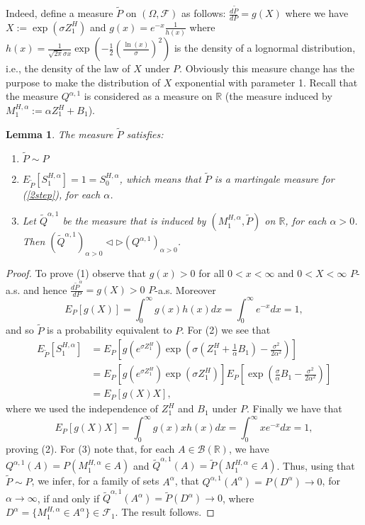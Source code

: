 \documentclass[reqno,a4paper]{amsart}
\theoremstyle{plain}
\theoremstyle{definition}
\theoremstyle{plain}
\newtheorem{lemma}{Lemma}
\theoremstyle{plain}
\theoremstyle{plain}
\begin{document}
Indeed, define a measure $\tilde{P}$ on $(\Omega,\mathcal{F})$ as follows: $\frac{d\tilde{P}}{dP}=g(X)$ where we have $X:=\exp(\sigma Z^H_1)$ and $g(x)=e^{-x}\frac1{h(x)}$ where $h(x)=\frac1{\sqrt{2\pi}\sigma x} \exp(-\frac12(\frac{\ln(x)}{\sigma})^2)$ is the density of a lognormal distribution, i.e., the density  of the law of $X$  under $P$. Obviously this measure change has the purpose to make the distribution of $X$ exponential with parameter 1. Recall that the measure $Q^{\alpha,1}$ is considered as a measure on ${{\mathbb R}}$ (the measure induced by $M_1^{H,\alpha}:=\alpha Z_1^H+B_1$).

\begin{lemma}\label{newemm}
The measure $\tilde{P}$ satisfies:
\begin{enumerate}
\item $\tilde{P}\sim P$
\item $E_{\tilde{P}}[S^{H,\alpha}_1]=1=S^{H,\alpha}_0$, which means that $\tilde{P}$ is a martingale measure for (\ref{2step}), for each $\alpha$.
\item Let $\tilde{Q}^{\alpha,1}$ be the measure that is induced by $(M_1^{H,\alpha},\tilde{P})$ on ${{\mathbb R}}$, for each $\alpha>0$. Then
$(\tilde{Q}^{\alpha,1})_{\alpha>0}\triangleleft\triangleright (Q^{\alpha,1})_{\alpha>0}$.
\end{enumerate}
\end{lemma}

\begin{proof}
To prove (1) observe that $g(x)>0$ for all $0<x<\infty$ and $0<X<\infty$ $P$-a.s. and hence $\frac{d\tilde{P}^{\alpha}}{dP}=g(X)>0$ $P$-a.s. Moreover
$$E_P[g(X)]=\int_0^{\infty}g(x)h(x)dx=\int_0^{\infty}e^{-x}dx=1,$$
and so $\tilde{P}$ is a probability equivalent to $P$.
\newline\newline
For (2) we see that
\begin{align}
E_{\tilde{P}}[S^{H,\alpha}_1] &=E_P\left[g\left(e^{\sigma Z^{H}_1}\right)\exp{\left(\sigma\left(Z^H_1+\frac1{\alpha} B_1\right)-\frac{\sigma^2}{2\alpha^2}\right)}\right]\nonumber\\
&=E_P\left[g\left(e^{\sigma Z^{H}_1}\right)\exp{\left(\sigma Z^H_1\right)}\right]E_P\left[\exp{\left(\frac{\sigma}{\alpha} B_1-\frac{\sigma^2}{2\alpha^2}\right)}\right]\nonumber\\
&=E_P[g(X)X],\nonumber
\end{align}
where we used the independence of $Z^{H}_1$ and $B_1$ under $P$. Finally we have that
$$E_P[g(X)X]=\int_0^{\infty}g(x)xh(x)dx=\int_0^{\infty}xe^{-x}dx=1,$$
proving (2).\newline\newline
For (3) note that, for each $A\in\mathcal{B}({{\mathbb R}})$, we have $Q^{\alpha,1}(A)=P(M_1^{H,\alpha}\in A)$ and $\tilde{Q}^{\alpha,1}(A)=\tilde{P}(M^{H,\alpha}_1\in A)$. Thus, using that $\tilde{P}\sim P$, we infer, for a family of sets $A^{\alpha}$, that $Q^{\alpha,1}(A^{\alpha})=P(D^{\alpha})\to0$, for $\alpha\to\infty$, if and only if $\tilde{Q}^{\alpha,1}(A^{\alpha})=\tilde{P}(D^{\alpha})\to0$, where $D^{\alpha}=\{M_1^{H,\alpha}\in A^{\alpha}\}\in\mathcal{F}_1$. The result follows.
\end{proof}
\end{document}
